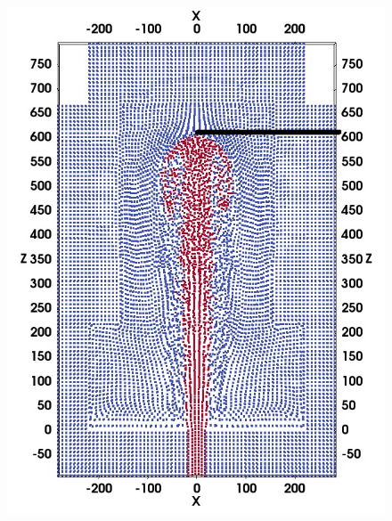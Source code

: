 \documentclass[preprint,12pt,authoryear]{elsarticle}
\begin{document}
\begin{figure}[H]
\begin{minipage}[t]{.325\textwidth}
    \end{minipage}%
    \\
    \centering
    \begin{minipage}[t]{.325 \textwidth}
        \centering
        \includegraphics[width=0.99 \textwidth]{./Figures/GSPH-HLLC-t3-cutView}
    \end{minipage}%
    \begin{minipage}[t]{.325\textwidth}
        \centering

\end{minipage}
\end{figure}
\end{document}
